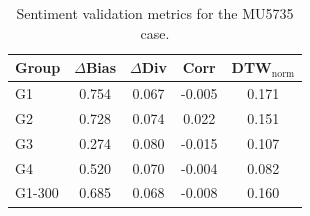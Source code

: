 \begin{table}[t]
\centering
\caption{Sentiment validation metrics for the MU5735 case.}
\label{tab:mu5735_metrics}
\begin{tabular}{lcccc}
\toprule
Group & $\Delta$Bias & $\Delta$Div & Corr & DTW$_{\mathrm{norm}}$ \\
\midrule
G1 & 0.754 & 0.067 & -0.005 & 0.171 \\
G2 & 0.728 & 0.074 & 0.022 & 0.151 \\
G3 & 0.274 & 0.080 & -0.015 & 0.107 \\
G4 & 0.520 & 0.070 & -0.004 & 0.082 \\
G1-300 & 0.685 & 0.068 & -0.008 & 0.160 \\
\bottomrule
\end{tabular}
\end{table}
